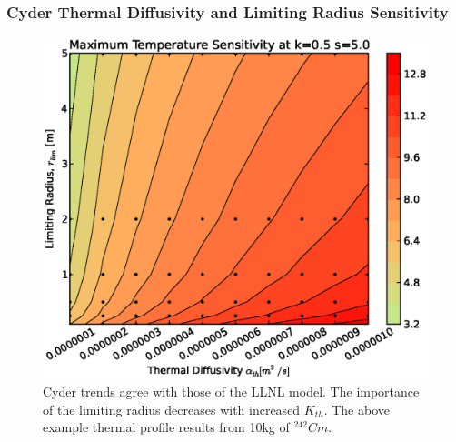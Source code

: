 \begin{frame}[ctb!]
\frametitle{Cyder Thermal Diffusivity and Limiting Radius Sensitivity}
\begin{figure}[htbp!]
\begin{center}
\includegraphics[height=0.7\textheight]{./thermal_demonstration/diffusivity/ar.eps}
\end{center}
\caption[$\alpha_{th}$ vs. $r_{lim}$ Sensitivity in Cyder]
{Cyder trends agree with those of the LLNL model. The importance of the 
limiting radius decreases with increased $K_{th}$. The above example thermal 
profile results from 10kg of $^{242}Cm$.}
\label{fig:ak}
\end{figure}
\end{frame}


